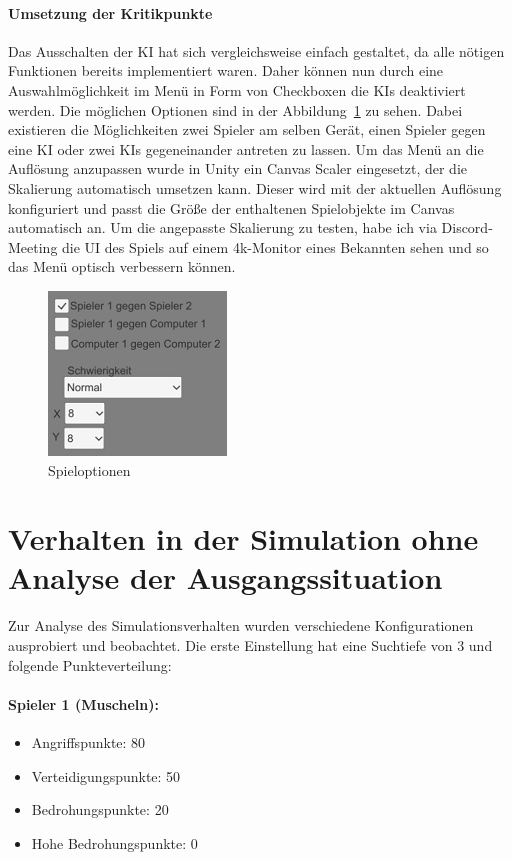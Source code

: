 \paragraph{Umsetzung der Kritikpunkte}
Das Ausschalten der KI hat sich vergleichsweise einfach gestaltet, da alle nötigen Funktionen bereits implementiert waren. Daher können nun durch eine Auswahlmöglichkeit im Menü in Form von Checkboxen die KIs deaktiviert werden. Die möglichen Optionen sind in der Abbildung~\ref{fig:Spieloptionen} zu sehen. Dabei existieren die Möglichkeiten zwei Spieler am selben Gerät, einen Spieler gegen eine KI oder zwei KIs gegeneinander antreten zu lassen. Um das Menü an die Auflösung anzupassen wurde in Unity ein Canvas Scaler eingesetzt, der die Skalierung automatisch umsetzen kann. Dieser wird mit der aktuellen Auflösung konfiguriert und passt die Größe der enthaltenen Spielobjekte im Canvas automatisch an. Um die angepasste Skalierung zu testen, habe ich via Discord-Meeting die UI des Spiels auf einem 4k-Monitor eines Bekannten sehen und so das Menü optisch verbessern können.



\begin{figure}[h]
	\centering
	\includegraphics{img/Spieloptionen2}
	\caption{Spieloptionen}
	\label{fig:Spieloptionen}
\end{figure}
\section{Verhalten in der Simulation ohne Analyse der Ausgangssituation}
\label{ch:Evaluierung:sec:Simulation}
Zur Analyse des Simulationsverhalten wurden verschiedene Konfigurationen ausprobiert und beobachtet. Die erste Einstellung hat eine Suchtiefe von 3 und folgende Punkteverteilung: \\
\paragraph{Spieler 1 (Muscheln):}
\begin{itemize}
	\item Angriffspunkte: 80
	\item Verteidigungspunkte: 50
	\item Bedrohungspunkte: 20
	\item Hohe Bedrohungspunkte: 0
\end{itemize}

